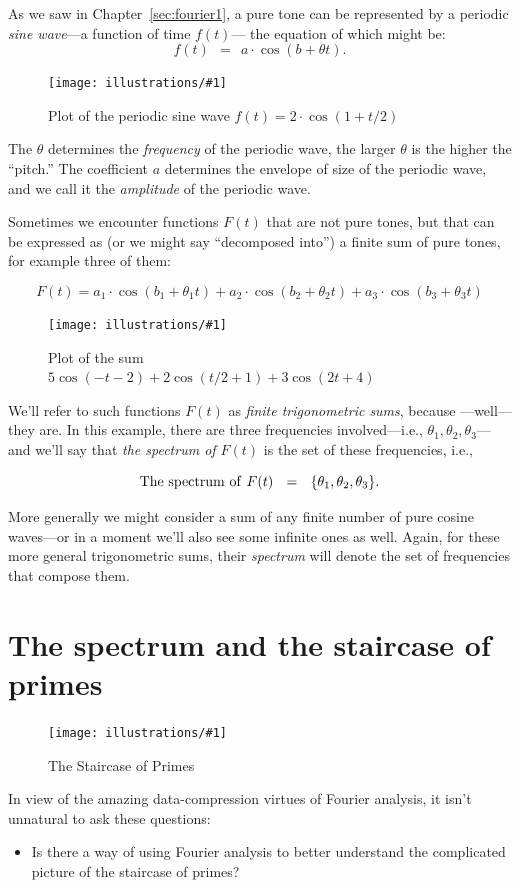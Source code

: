 \documentclass[openany]{book}
\newcommand{\ill}[3]{%
   \begin{figure}[H]%
   \vspace{-2ex}
   \centering%
   \texttt{[image: illustrations/\#1]}%
   \caption{#3}%
   \vspace{-2ex}
    \end{figure}}
\theoremstyle{plain}
\theoremstyle{definition}
\begin{document}
{{As we saw in Chapter~\ref{sec:fourier1}, a pure tone can be represented by a periodic {\it sine wave}---a function of  time $f(t)$--- the equation of which might be:
$$f(t)\ \ = \ \ a\cdot \cos(b +\theta t).$$

\ill{pure_tone}{.7}{Plot of the periodic sine wave $f(t) = 2\cdot \cos(1+t/2)$}

The $\theta$ determines the {\it frequency} of the periodic wave, the
larger $\theta$ is the higher the ``pitch.''  The coefficient $a$
determines the envelope of size of the periodic wave, and we call it
the {\it amplitude} of the periodic wave.

Sometimes we encounter functions $F(t)$ that are not pure tones, but
that can be expressed as (or we might say ``decomposed into'') a finite
sum of pure tones, for example three of them:

$$F(t)  = a_1\cdot \cos(b_1 +\theta_1 t) + a_2\cdot \cos(b_2 +\theta_2 t) + a_3\cdot \cos(b_3 +\theta_3 t)$$

\ill{mixed_tone3}{.7}{Plot of the sum $5  \cos\left(-t - 2\right) + 2 \cos\left(t/2 + 1\right) + 3  \cos\left(2  t + 4\right)$}

We'll refer to such functions $F(t)$ as {\it finite trigonometric
  sums}, because ---well---they are.  In this example, there are three
frequencies involved---i.e., $\theta_1,\theta_2,\theta_3$---and we'll
say that {\it the spectrum of $F(t)$} is the set of these frequencies,
i.e.,

$$
  {\rm The\ spectrum \ of \ } F(t) \ \ = \ \ \{\theta_1,\theta_2,\theta_3\}.
$$

More generally we might consider a sum of any finite number of pure
cosine waves---or in a moment we'll also see some infinite ones as
well. Again, for these more general trigonometric sums, their {\it
  spectrum} will denote the set of frequencies that compose them.

\chapter{The spectrum and the staircase of primes\label{sec:fourier_staircase}}

\ill{prime_pi_100_aspect1}{0.95}{The Staircase of Primes\label{fig:staircase100}}


In view of the amazing data-compression virtues of Fourier analysis,
it isn't unnatural to ask these questions:

\begin{itemize}
\item Is there a way of using Fourier analysis to better understand
  the complicated picture of the staircase of primes?


\end{itemize}}}
\end{document}
